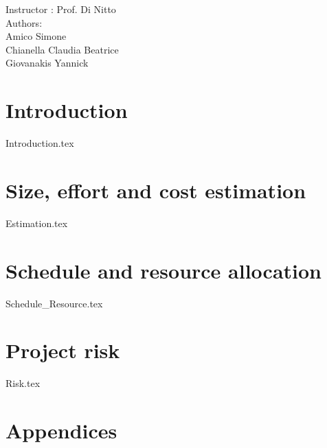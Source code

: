 \documentclass[12pt]{article}
\begin{document}
	\begin{center}
	 	{\Large Instructor : Prof. Di Nitto}
	 	 \vspace{5mm}\\	 
	 	{\Large Authors:}\\
	 	{\Large Amico Simone}\\
	 	{\Large Chianella Claudia Beatrice}\\
	 	{\Large Giovanakis Yannick}
	\end{center}
	 
	\newpage
	
	
	\tableofcontents{}
	 
	\newpage
		
	
	\section{Introduction}
	{Introduction.tex}
	
	\newpage

	
	\section{Size, effort and cost estimation}
	{Estimation.tex}
	
	\newpage
	
	\section{Schedule and resource allocation}
	{Schedule_Resource.tex}
	
	\newpage
	
	\section{Project risk}
	{Risk.tex}
	\newpage
	
			
	\section{Appendices}
\end{document}
